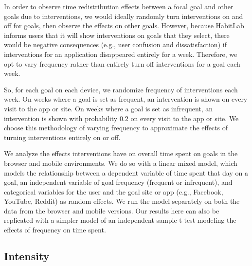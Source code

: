 In order to observe time redistribution effects between a focal goal and other goals due to interventions, we would ideally randomly turn interventions on and off for goals, then observe the effects on other goals. However, because HabitLab informs users that it will show interventions on goals that they select, there would be negative consequences (e.g., user confusion and dissatisfaction) if interventions for an application disappeared entirely for a week. Therefore, we opt to vary frequency rather than entirely turn off interventions for a goal each week. %

So, for each goal on each device, we randomize frequency of interventions each week. On weeks where a goal is set as frequent, an intervention is shown on every visit to the app or site. On weeks where a goal is set as infrequent, an intervention is shown with probability $0.2$ on every visit to the app or site. We choose this methodology of varying frequency to approximate the effects of turning interventions entirely on or off. %

We analyze the effects interventions have on overall time spent on goals in the browser and mobile environments. We do so with a linear mixed model, which models the relationship between a dependent variable of time spent that day on a goal, an independent variable of goal frequency (frequent or infrequent), and categorical variables for the user and the goal site or app (e.g., Facebook, YouTube, Reddit) as random effects. We run the model separately on both the data from the browser and mobile versions. %
Our results here can also be replicated with a simpler model of an independent sample t-test modeling the effects of frequency on time spent.

\subsection{Intensity}

